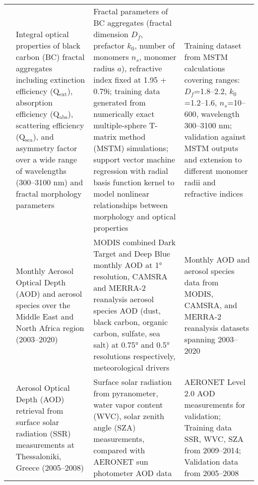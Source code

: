 \documentclass[11pt]{article}
\begin{document}
\begin{landscape}
\begin{longtable}{>{\raggedright\arraybackslash}p{2cm} 
        >{\raggedright\arraybackslash}p{4cm} 
        >{\raggedright\arraybackslash}p{10cm} 
        >{\raggedright\arraybackslash}p{6cm}}
\citet{luo2018applying} & Integral optical properties of black carbon (BC) fractal aggregates including extinction efficiency (Q$_\mathrm{ext}$), absorption efficiency (Q$_\mathrm{abs}$), scattering efficiency (Q$_\mathrm{sca}$), and asymmetry factor over a wide range of wavelengths (300–3100 nm) and fractal morphology parameters & Fractal parameters of BC aggregates (fractal dimension $D_f$, prefactor $k_0$, number of monomers $n_s$, monomer radius $a$), refractive index fixed at 1.95 + 0.79i; training data generated from numerically exact multiple-sphere T-matrix method (MSTM) simulations; support vector machine regression with radial basis function kernel to model nonlinear relationships between morphology and optical properties & Training dataset from MSTM calculations covering ranges: $D_f$=1.8–2.2, $k_0$=1.2–1.6, $n_s$=10–600, wavelength 300–3100 nm; validation against MSTM outputs and extension to different monomer radii and refractive indices \\[6pt]

\citet{berhane2024comprehensive} & Monthly Aerosol Optical Depth (AOD) and aerosol species over the Middle East and North Africa region (2003–2020) & MODIS combined Dark Target and Deep Blue monthly AOD at 1° resolution, CAMSRA and MERRA-2 reanalysis aerosol species AOD (dust, black carbon, organic carbon, sulfate, sea salt) at 0.75° and 0.5° resolutions respectively, meteorological drivers & Monthly AOD and aerosol species data from MODIS, CAMSRA, and MERRA-2 reanalysis datasets spanning 2003–2020 \\[6pt]

\citet{huttunen2016retrieval} & Aerosol Optical Depth (AOD) retrieval from surface solar radiation (SSR) measurements at Thessaloniki, Greece (2005–2008) & Surface solar radiation from pyranometer, water vapor content (WVC), solar zenith angle (SZA) measurements, compared with AERONET sun photometer AOD data & AERONET Level 2.0 AOD measurements for validation; Training data SSR, WVC, SZA from 2009–2014; Validation data from 2005–2008 \\[6pt]


\end{longtable}
\end{landscape}
\end{document}
